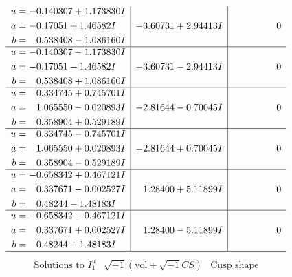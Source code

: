 \documentclass[1p]{elsarticle_modified}
\theoremstyle{definition}
\newcommand{\I}{\sqrt{-1}}
\begin{document}
$$\begin{array}{c|c|c}
\begin{aligned}
u &= -0.140307 + 1.173830 I \\
a &= -0.17051 + 1.46582 I \\
b &= \phantom{-}0.538408 - 1.086160 I\end{aligned}
 & -3.60731 + 2.94413 I & \phantom{-0.000000 } 0 \\ \hline\begin{aligned}
u &= -0.140307 - 1.173830 I \\
a &= -0.17051 - 1.46582 I \\
b &= \phantom{-}0.538408 + 1.086160 I\end{aligned}
 & -3.60731 - 2.94413 I & \phantom{-0.000000 } 0 \\ \hline\begin{aligned}
u &= \phantom{-}0.334745 + 0.745701 I \\
a &= \phantom{-}1.065550 - 0.020893 I \\
b &= \phantom{-}0.358904 + 0.529189 I\end{aligned}
 & -2.81644 - 0.70045 I & \phantom{-0.000000 } 0 \\ \hline\begin{aligned}
u &= \phantom{-}0.334745 - 0.745701 I \\
a &= \phantom{-}1.065550 + 0.020893 I \\
b &= \phantom{-}0.358904 - 0.529189 I\end{aligned}
 & -2.81644 + 0.70045 I & \phantom{-0.000000 } 0 \\ \hline\begin{aligned}
u &= -0.658342 + 0.467121 I \\
a &= \phantom{-}0.337671 - 0.002527 I \\
b &= \phantom{-}0.48244 - 1.48183 I\end{aligned}
 & \phantom{-}1.28400 + 5.11899 I & \phantom{-0.000000 } 0 \\ \hline\begin{aligned}
u &= -0.658342 - 0.467121 I \\
a &= \phantom{-}0.337671 + 0.002527 I \\
b &= \phantom{-}0.48244 + 1.48183 I\end{aligned}
 & \phantom{-}1.28400 - 5.11899 I & \phantom{-0.000000 } 0\\
 \hline 
 \end{array}$$\newpage$$\begin{array}{c|c|c}  
\text{Solutions to }I^u_{1}& \I (\text{vol} + \sqrt{-1}CS) & \text{Cusp shape}\\
 \hline 
\begin{aligned}

\end{aligned}
\end{array}$$
\end{document}
